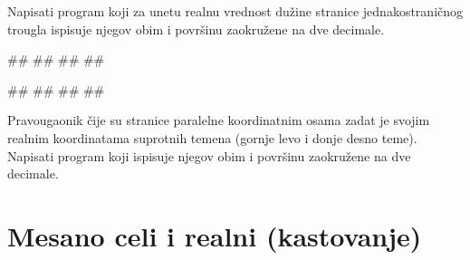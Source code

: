 \begin{Exercise}[label=p1.1_03] 
Napisati program koji za unetu realnu vrednost dužine stranice jednakostraničnog trougla ispisuje njegov obim i površinu zaokružene na dve decimale. 

\begin{miditest}
\begin{upotreba}{1}
#\naslovInt#
##
##
##
\end{upotreba}
\end{miditest}
\begin{miditest}
\begin{upotreba}{1}
#\naslovInt#
##
##
##
\end{upotreba}
\end{miditest}
\end{Exercise}
\begin{Answer}[ref=p1.1_03]
\end{Answer}


\begin{Exercise}[label=p1_13] 
Pravougaonik čije su stranice paralelne koordinatnim osama zadat je svojim realnim koordinatama suprotnih temena (gornje levo i donje desno teme). Napisati program koji ispisuje njegov obim i površinu zaokružene na dve decimale. 
\end{Exercise}

\section{Mesano celi i realni (kastovanje)}

